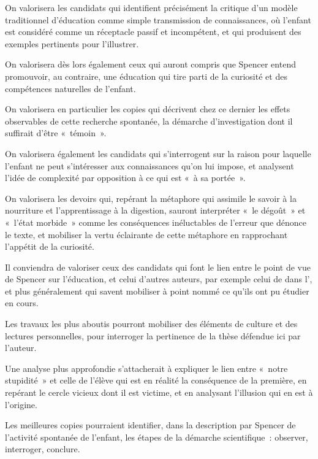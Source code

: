 		{On valorisera les candidats qui identifient précisément la critique d'un modèle
traditionnel d'éducation comme simple transmission de connaissances, où l'enfant est
considéré comme un réceptacle passif et incompétent, et qui produisent des exemples
pertinents pour l'illustrer.

On valorisera dès lors également ceux qui auront compris que Spencer entend
promouvoir, au contraire, une éducation qui tire parti de la curiosité et des
compétences naturelles de l'enfant.

On valorisera en particulier les copies qui décrivent chez ce dernier les effets
observables de cette recherche spontanée, la démarche d'investigation dont il suffirait
d'être «~témoin~».

On valorisera également les candidats qui s'interrogent sur la raison pour
laquelle l'enfant ne peut s'intéresser aux connaissances qu'on lui impose, et analysent
l'idée de complexité par opposition à ce qui est «~à sa portée~».

On valorisera les devoirs qui, repérant la métaphore qui assimile le savoir à la
nourriture et l'apprentissage à la digestion, sauront interpréter «~le dégoût~» et «~l'état
morbide~» comme les conséquences inéluctables de l'erreur que dénonce le texte, et
mobiliser la vertu éclairante de cette métaphore en rapprochant l'appétit de la curiosité.

Il conviendra de valoriser ceux des candidats qui font le lien entre le point de
vue de Spencer sur l'éducation, et celui d'autres auteurs, par exemple celui de  dans l', et plus généralement qui savent mobiliser à
point nommé ce qu'ils ont pu étudier en cours.

Les travaux les plus aboutis pourront mobiliser des éléments de culture et des
lectures personnelles, pour interroger la pertinence de la thèse défendue ici par
l'auteur.

Une analyse plus approfondie s'attacherait à expliquer le lien entre «~notre
stupidité~» et celle de l'élève qui est en réalité la conséquence de la première, en
repérant le cercle vicieux dont il est victime, et en analysant l'illusion qui en est à
l'origine.

Les meilleures copies pourraient identifier, dans la description par Spencer de
l'activité spontanée de l'enfant, les étapes de la démarche scientifique~: observer,
interroger, conclure.}%
